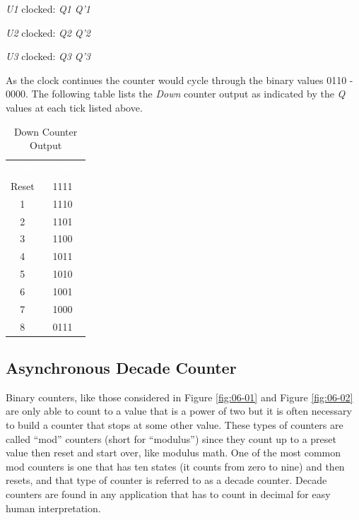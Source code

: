 \begin{description}
	\hspace{14pt}\textit{U1} clocked: \textit{Q1} \textuparrow \: \textemdash \: \textit{Q'1} \textdownarrow
	
	\hspace{14pt}\textit{U2} clocked: \textit{Q2} \textuparrow \: \textemdash \: \textit{Q'2} \textdownarrow
	
	\hspace{14pt}\textit{U3} clocked: \textit{Q3} \textdownarrow \: \textemdash \: \textit{Q'3} \textuparrow
	
\end{description}

As the clock continues the counter would cycle through the binary values 0110 - 0000. The following table lists the \textit{Down} counter output as indicated by the \textit{Q} values at each tick listed above.

\begin{table}[H]
	\sffamily
	\newcommand{\head}[1]{\textcolor{white}{\textbf{#1}}}		
	\begin{center}
		\begin{tabular}{cc} 
			\rowcolor{black!75}
			\head{Tick} & \head{Output} \\
			Reset & 1111 \\
			1 & 1110 \\
			2 & 1101 \\
			3 & 1100 \\
			4 & 1011 \\
			5 & 1010 \\
			6 & 1001 \\
			7 & 1000 \\
			8 & 0111
		\end{tabular}
	\end{center}
	\caption{Down Counter Output}
	\label{tab0602}
\end{table}


\subsection{Asynchronous Decade Counter}

Binary counters, like those considered in Figure \ref{fig:06-01} and Figure \ref{fig:06-02} are only able to count to a value that is a power of two but it is often necessary to build a counter that stops at some other value. These types of counters are called ``mod'' counters (short for ``modulus'') since they count up to a preset value then reset and start over, like modulus math. One of the most common mod counters is one that has ten states (it counts from zero to nine) and then resets, and that type of counter is referred to as a decade counter. Decade counters are found in any application that has to count in decimal for easy human interpretation.

